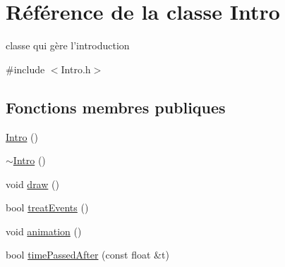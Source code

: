 \hypertarget{classIntro}{
\section{Référence de la classe Intro}
\label{classIntro}
}


classe qui gère l'introduction  




{\ttfamily \#include $<$Intro.h$>$}

\subsection*{Fonctions membres publiques}
\begin{DoxyCompactItemize}
\item 
\hyperlink{classIntro_a39875a338e68b4e2fba74693131ae498}{Intro} ()
\item 
\hyperlink{classIntro_a024067dadaf97daca3bfeb0f22e9c183}{$\sim$Intro} ()
\item 
void \hyperlink{classIntro_abbe46765377b4e95e624d6c8119653ce}{draw} ()
\item 
bool \hyperlink{classIntro_af473d6740aad00c9915126b0b1c73e6b}{treatEvents} ()
\item 
void \hyperlink{classIntro_a7a98b939a90e05494d7631e7f3139e25}{animation} ()
\item 
bool \hyperlink{classIntro_a74b53719df9f168e1276bc03c4945665}{timePassedAfter} (const float \&t)
\end{DoxyCompactItemize}
